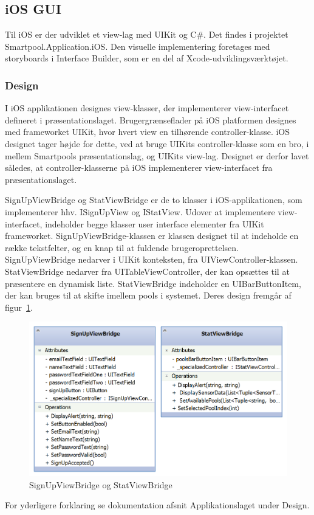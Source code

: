\subsection{iOS GUI}
Til iOS er der udviklet et view-lag med UIKit og C\#. Det findes i projektet Smartpool.Application.iOS.
Den visuelle implementering foretages med storyboards i Interface Builder, som er en del af Xcode-udviklingsværktøjet.

\subsubsection{Design}
I iOS applikationen designes view-klasser, der implementerer view-interfacet defineret i præsentationslaget. Brugergrænseflader på iOS platformen designes med frameworket UIKit, hvor hvert view en tilhørende controller-klasse. iOS designet tager højde for dette, ved at bruge UIKits controller-klasse som en bro, i mellem Smartpools præsentationslag, og UIKits view-lag. Designet er derfor lavet således, at controller-klasserne på iOS implementerer view-interfacet fra præsentationslaget.

SignUpViewBridge og StatViewBridge er de to klasser i iOS-applikationen, som implementerer hhv. ISignUpView og IStatView. Udover at implementere view-interfacet, indeholder begge klasser user interface elementer fra UIKit frameworket. SignUpViewBridge-klassen er klassen designet til at indeholde en række tekstfelter, og en knap til at fuldende brugeroprettelsen. SignUpViewBridge nedarver i UIKit konteksten, fra UIViewController-klassen. StatViewBridge nedarver fra UITableViewController, der kan opsættes til at præsentere en dynamisk liste. StatViewBridge indeholder en UIBarButtonItem, der kan bruges til at skifte imellem pools i systemet. Deres design fremgår af figur~\ref{fig:ios_viewbridges}.

\begin{figure}
	\centering
	\includegraphics[width=0.7\linewidth]{figs/design/ios_viewbridges}
	\caption{SignUpViewBridge og StatViewBridge}
	\label{fig:ios_viewbridges}
\end{figure}

For yderligere forklaring se dokumentation afsnit Applikationslaget under Design.